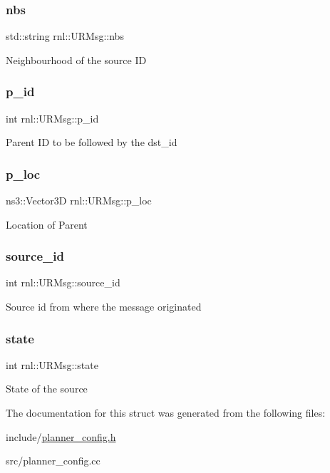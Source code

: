 \subsubsection{\texorpdfstring{nbs}{nbs}}
{\footnotesize\ttfamily std\+::string rnl\+::\+U\+R\+Msg\+::nbs}

Neighbourhood of the source ID \mbox{\label{structrnl_1_1URMsg_a2c715d2283dc3c67b4d8bb5a842f4d50}} 
\subsubsection{\texorpdfstring{p\+\_\+id}{p\_id}}
{\footnotesize\ttfamily int rnl\+::\+U\+R\+Msg\+::p\+\_\+id}

Parent ID to be followed by the dst\+\_\+id \mbox{\label{structrnl_1_1URMsg_a49ec7a35da6a24a3c93775322c7ed91f}} 
\subsubsection{\texorpdfstring{p\+\_\+loc}{p\_loc}}
{\footnotesize\ttfamily ns3\+::\+Vector3D rnl\+::\+U\+R\+Msg\+::p\+\_\+loc}

Location of Parent \mbox{\label{structrnl_1_1URMsg_aba36df412b09ba5028442c4ea7c1bb36}} 
\subsubsection{\texorpdfstring{source\+\_\+id}{source\_id}}
{\footnotesize\ttfamily int rnl\+::\+U\+R\+Msg\+::source\+\_\+id}

Source id from where the message originated \mbox{\label{structrnl_1_1URMsg_aeae1d18c4f3a5d08ae319d9281d13a17}} 
\subsubsection{\texorpdfstring{state}{state}}
{\footnotesize\ttfamily int rnl\+::\+U\+R\+Msg\+::state}

State of the source 

The documentation for this struct was generated from the following files\+:\begin{DoxyCompactItemize}
\item 
include/\hyperlink{planner__config_8h}{planner\+\_\+config.\+h}\item 
src/planner\+\_\+config.\+cc\end{DoxyCompactItemize}
